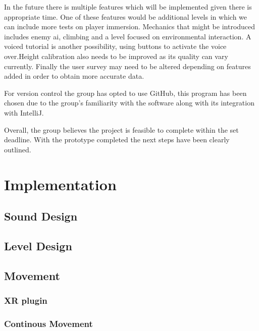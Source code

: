 In the future there is multiple features which will be implemented given there is appropriate time. One of these features would be additional levels in which we can include more tests on player immersion. Mechanics that might be introduced includes enemy ai, climbing and a level focused on environmental interaction. A voiced tutorial is another possibility, using buttons to activate the voice over.Height calibration also needs to be improved as its quality can vary currently. Finally the user survey may need to be altered depending on features added in order to obtain more accurate data.

For version control the group has opted to use GitHub, this program has been chosen due to the group's familiarity with the software along with its integration with IntelliJ.

Overall, the group believes the project is feasible to complete within the set deadline. With the prototype completed the next steps have been clearly outlined. 


\chapter{Implementation}

\section{Sound Design}

\section{Level Design}

\section{Movement}

\subsection{XR plugin}
\subsection{Continous Movement}
\subsection{}

